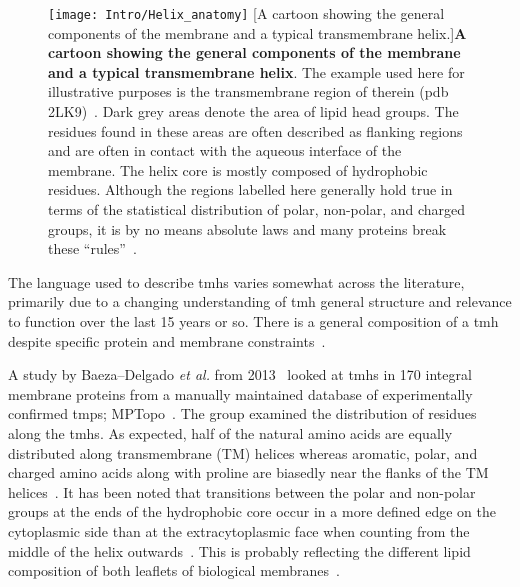 \begin{figure}[ht]
\centering
\texttt{[image: Intro/Helix\_anatomy]}
		[A cartoon showing the general components of the membrane and a typical transmembrane helix.]{\textbf{A cartoon showing the general components of the membrane and a typical transmembrane helix}.
		The example used here for illustrative purposes is the transmembrane region of therein (\gls{pdb} 2LK9)~\cite{Skasko2012}.
		Dark grey areas denote the area of lipid head groups.
		The residues found in these areas are often described as flanking regions and are often in contact with the aqueous interface of the membrane.
		The helix core is mostly composed of hydrophobic residues.
		Although the regions labelled here generally hold true in terms of the statistical distribution of polar, non-polar, and charged groups, it is by no means absolute laws and many proteins break these ``rules''~\cite{Sharpe2010, Baeza-Delgado2013, Pogozheva2013}.}

\label{fig:helixcartoon1}
\end{figure}


The language used to describe \gls{tmh}s varies somewhat across the literature, primarily due to a changing understanding of \gls{tmh} general structure and relevance to function over the last 15 years or so.
There is a general composition of a \gls{tmh} despite specific protein and membrane constraints~\cite{Sharpe2010}.

A study by Baeza\---Delgado \textit{ et al.} from 2013~\cite{Baeza-Delgado2013} looked at \gls{tmh}s in 170 integral membrane proteins from a manually maintained database of experimentally confirmed \gls{tmp}s; MPTopo~\cite{Jayasinghe2001}.
The group examined the distribution of residues along the \gls{tmh}s.
As expected, half of the natural amino acids are equally distributed along transmembrane (TM) helices whereas aromatic, polar, and charged amino acids along with proline are biasedly near the flanks of the TM helices~\cite{Baeza-Delgado2013}.
It has been noted that transitions between the polar and non-polar groups at the ends of the hydrophobic core occur in a more defined edge on the cytoplasmic side than at the extracytoplasmic face when counting from the middle of the helix outwards~\cite{Baeza-Delgado2013}.
This is probably reflecting the different lipid composition of both leaflets of biological membranes~\cite{Baeza-Delgado2013}.


